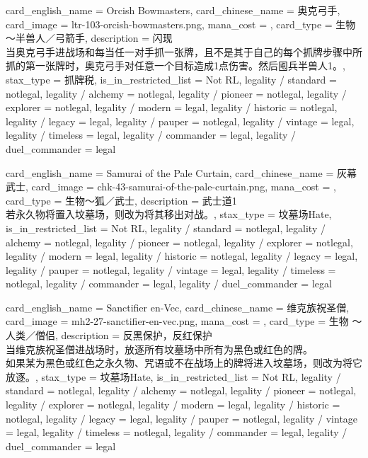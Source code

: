 \documentclass[lang = cn, color = black, 10pt]{AllThatStax}
\begin{document}
\card
{
	card_english_name = {Orcish Bowmasters},
	card_chinese_name = {奥克弓手},
	card_image = ltr-103-orcish-bowmasters.png,
	mana_cost = ,
	card_type = 生物 ～半兽人／弓箭手,
	description = {闪现\\
		当奥克弓手进战场和每当任一对手抓一张牌，且不是其于自己的每个抓牌步骤中所抓的第一张牌时，奥克弓手对任意一个目标造成1点伤害。然后囤兵半兽人1。},
	stax_type = 抓牌税,
	is_in_restricted_list = Not RL,
	legality / standard = notlegal,
	legality / alchemy = notlegal,
	legality / pioneer = notlegal,
	legality / explorer = notlegal,
	legality / modern = legal,
	legality / historic = notlegal,
	legality / legacy = legal,
	legality / pauper = notlegal,
	legality / vintage = legal,
	legality / timeless = legal,
	legality / commander = legal,
	legality / duel_commander = legal
}

\card
{
	card_english_name = {Samurai of the Pale Curtain},
	card_chinese_name = {灰幕武士},
	card_image = chk-43-samurai-of-the-pale-curtain.png,
	mana_cost = ,
	card_type = 生物～狐／武士,
	description = {武士道1\\
		若永久物将置入坟墓场，则改为将其移出对战。},
	stax_type = 坟墓场Hate,
	is_in_restricted_list = Not RL,
	legality / standard = notlegal,
	legality / alchemy = notlegal,
	legality / pioneer = notlegal,
	legality / explorer = notlegal,
	legality / modern = legal,
	legality / historic = notlegal,
	legality / legacy = legal,
	legality / pauper = notlegal,
	legality / vintage = legal,
	legality / timeless = notlegal,
	legality / commander = legal,
	legality / duel_commander = legal
}

\card
{
	card_english_name = {Sanctifier en-Vec},
	card_chinese_name = {维克族祝圣僧},
	card_image = mh2-27-sanctifier-en-vec.png,
	mana_cost = ,
	card_type = 生物 ～人类／僧侣,
	description = {反黑保护，反红保护\\
		当维克族祝圣僧进战场时，放逐所有坟墓场中所有为黑色或红色的牌。\\
		如果某为黑色或红色之永久物、咒语或不在战场上的牌将进入坟墓场，则改为将它放逐。},
	stax_type = 坟墓场Hate,
	is_in_restricted_list = Not RL,
	legality / standard = notlegal,
	legality / alchemy = notlegal,
	legality / pioneer = notlegal,
	legality / explorer = notlegal,
	legality / modern = legal,
	legality / historic = notlegal,
	legality / legacy = legal,
	legality / pauper = notlegal,
	legality / vintage = legal,
	legality / timeless = notlegal,
	legality / commander = legal,
	legality / duel_commander = legal
}
\end{document}
